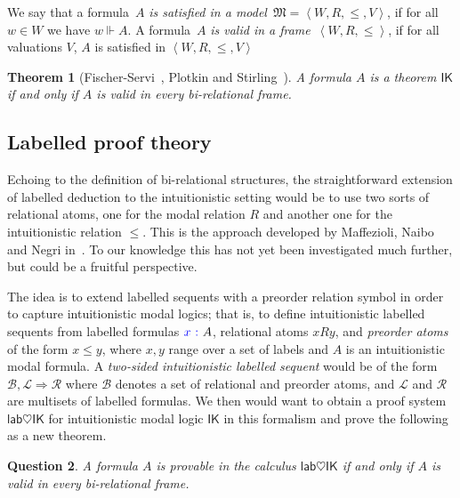 \documentclass{article}
\newtheorem{theorem}{Theorem}%
\newtheorem{question}[theorem]{Question}
\newcommand*\mdelim[3]{%
	\mathopen{}\left#1%
	#3%
	\right#2\mathclose{}%
}
\newcommand*{\tuple}{\mdelim{\langle}{\rangle}}
\newcommand*{\M}{\mathfrak{M}}
\newcommand{\force}[2]{#1\Vdash#2}
\newcommand*{\sys}[1]{\ensuremath{\mathsf{#1}}}%
\newcommand*{\IK}{\sys{IK}}
\newcommand*{\lab}{\mathsf{lab}}
\newcommand{\SEQ}{\Rightarrow}
\newcommand*{\Labx}{\mathcal{L}}
\newcommand*{\Rabx}{\mathcal{R}}
\newcommand*{\Bx}{\mathcal{B}}
\newcommand*{\labels}[2]{{\color{blue}{#1}\:\colon}{#2}}
\newcommand*{\rel}{R}
\begin{document}

We say that a formula~$A$ \emph{is satisfied in a model}~$\M=\tuple{W,R,\le,V}$, if for all $w\in W$ we have $\force{w}{A}$. 
%
A formula~$A$ \emph{is valid in a frame}~$\tuple{W,R,\le}$, if for all valuations $V$, $A$ is satisfied in $\tuple{W,R,\le,V}$

\begin{theorem}[Fischer-Servi~\cite{fischer-servi:84}, Plotkin and Stirling~\cite{plotkin:stirling:86}]
	A formula $A$ is a theorem $\IK$ if and only if $A$ is valid in every bi-relational frame.
\end{theorem}

\subsection{Labelled proof theory}

Echoing to the definition of bi-relational structures, the straightforward extension of labelled deduction to the intuitionistic setting would be to use two sorts of relational atoms, one for the modal relation $\rel$ and another one for the intuitionistic relation $\le$.
%
This is the approach developed by Maffezioli, Naibo and Negri in~\cite{maffezioli:etal:synthese13}.
%
To our knowledge this has not yet been investigated much further, but could be a fruitful perspective.

The idea is to extend labelled sequents with a preorder relation symbol in order to capture intuitionistic modal logics;
%
that is, to define intuitionistic labelled sequents from {labelled formulas} $\labels{x}{A}$, {relational atoms} $x \rel y$, and \emph{preorder atoms} of the form $x \le y$, where $x, y$ range over a set of {labels} and $A$ is an intuitionistic modal formula.
%
A \emph{two-sided intuitionistic labelled sequent} would be of the form $\Bx, \Labx \SEQ \Rabx$ where $\Bx$ denotes a set of relational and preorder atoms, and $\Labx$ and $\Rabx$ are multisets of labelled formulas.	
%
We then would want to obtain a proof system $\lab\heartsuit\IK$ for intuitionistic modal logic $\IK$ in this formalism and prove the following as a new theorem.

\begin{question}
	A formula $A$ is provable in the calculus $\lab\heartsuit\IK$ if and only if $A$ is valid in every bi-relational frame.
\end{question}
\end{document}
